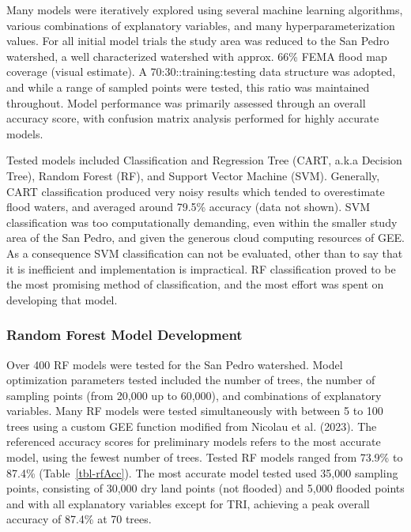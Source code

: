 \documentclass[
]{agujournal2019}
\begin{document}
Many models were iteratively explored using several machine learning
algorithms, various combinations of explanatory variables, and many
hyperparameterization values. For all initial model trials the study
area was reduced to the San Pedro watershed, a well characterized
watershed with approx. 66\% FEMA flood map coverage (visual estimate). A
70:30::training:testing data structure was adopted, and while a range of
sampled points were tested, this ratio was maintained throughout. Model
performance was primarily assessed through an overall accuracy score,
with confusion matrix analysis performed for highly accurate models.

Tested models included Classification and Regression Tree (CART, a.k.a
Decision Tree), Random Forest (RF), and Support Vector Machine (SVM).
Generally, CART classification produced very noisy results which tended
to overestimate flood waters, and averaged around 79.5\% accuracy (data
not shown). SVM classification was too computationally demanding, even
within the smaller study area of the San Pedro, and given the generous
cloud computing resources of GEE. As a consequence SVM classification
can not be evaluated, other than to say that it is inefficient and
implementation is impractical. RF classification proved to be the most
promising method of classification, and the most effort was spent on
developing that model.

\subsubsection{Random Forest Model
Development}\label{random-forest-model-development}

Over 400 RF models were tested for the San Pedro watershed. Model
optimization parameters tested included the number of trees, the number
of sampling points (from 20,000 up to 60,000), and combinations of
explanatory variables. Many RF models were tested simultaneously with
between 5 to 100 trees using a custom GEE function modified from Nicolau
et al. (2023). The referenced accuracy scores for preliminary models
refers to the most accurate model, using the fewest number of trees.
Tested RF models ranged from 73.9\% to 87.4\% (Table~\ref{tbl-rfAcc}).
The most accurate model tested used 35,000 sampling points, consisting
of 30,000 dry land points (not flooded) and 5,000 flooded points and
with all explanatory variables except for TRI, achieving a peak overall
accuracy of 87.4\% at 70 trees.
\end{document}
